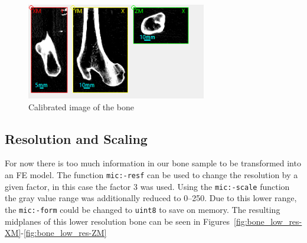 \documentclass[a4paper,12pt]{article}
\begin{document}
    \begin{figure}[htbp]
        \centering
        \includegraphics[width=0.7\textwidth]{bone_calibrated}
        \caption{Calibrated image of the bone}
        \label{fig:bone_calibrated}
    \end{figure}

    \subsection{Resolution and Scaling}\label{subsec:resolution-and-scaling}
    For now there is too much information in our bone sample to be transformed into an FE model.
    The function \texttt{mic:-resf} can be used to change the resolution by a given factor, in this case the factor 3 was used.
    Using the \texttt{mic:-scale} function the gray value range was additionally reduced to 0--250.
    Due to this lower range, the \texttt{mic:-form} could be changed to \texttt{uint8} to save on memory.
    The resulting midplanes of this lower resolution bone can be seen in Figures~\ref{fig:bone_low_res-XM}-\ref{fig:bone_low_res-ZM}
\end{document}
